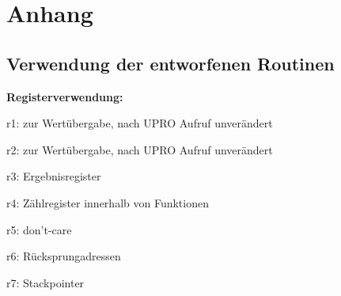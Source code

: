 \documentclass[fleqn, a4paper, 11pt]{article}       %
\begin{document}
%

\newpage
\appendix %
\section{Anhang}
\subsection{Verwendung der entworfenen Routinen \label{A.Man}}



 \textbf{Registerverwendung:}
 \begin{compactitem}
     \item r1: zur Wertübergabe, nach UPRO Aufruf unverändert
     \item r2: zur Wertübergabe, nach UPRO Aufruf unverändert
     \item r3: Ergebnisregister
     \item r4: Zählregister innerhalb von Funktionen
     \item r5: don't-care
     \item r6: Rücksprungadressen
     \item r7: Stackpointer
 \end{compactitem}
 
\end{document}

